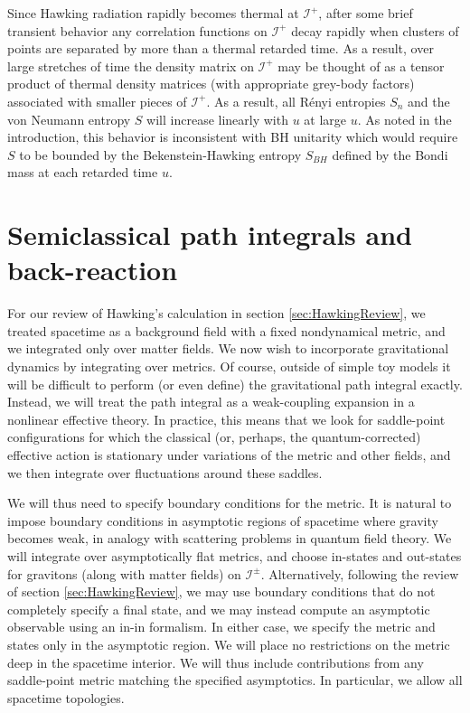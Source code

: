 \documentclass[letterpaper,12pt]{article}
\newcommand*{\scri}{\mathscr{I}} %
\begin{document}
Since Hawking radiation rapidly becomes thermal at $\scri^+$, after some brief transient behavior any correlation functions on $\scri^+$ decay rapidly when clusters of points are separated by more than a thermal retarded time.  As a result, over large stretches of time the density matrix on $\scri^+$ may be thought of as a tensor product of thermal density matrices (with appropriate grey-body factors) associated with smaller pieces of $\scri^+$.   As a result, all R\'enyi entropies $S_n$ and the von Neumann entropy $S$ will increase linearly with $u$ at large $u$.  As noted in the introduction, this behavior is inconsistent with BH unitarity which would require $S$ to be bounded by the Bekenstein-Hawking entropy $S_{BH}$ defined by the Bondi mass at each retarded time $u$.

\section{Semiclassical path integrals and back-reaction}
\label{sec:semiclassical}


For our review of Hawking's calculation in section \ref{sec:HawkingReview}, we treated spacetime as a background field with a fixed nondynamical metric, and  we integrated only over matter fields. We now wish to incorporate gravitational dynamics by integrating over metrics. Of course, outside of simple toy models it will be difficult to perform (or even define) the gravitational path integral exactly. Instead, we will treat the path integral as a weak-coupling expansion in a nonlinear effective theory. In practice, this means that we look for saddle-point configurations for which the classical (or, perhaps, the quantum-corrected) effective action is stationary under variations of the metric and other fields, and we then integrate over fluctuations around these saddles.

We will thus need to specify boundary conditions for the metric. It is natural to impose boundary conditions in asymptotic regions of spacetime where gravity becomes weak, in analogy with scattering problems in quantum field theory.  We will integrate over asymptotically flat metrics, and choose in-states and out-states for gravitons (along with matter fields) on $\scri^\pm$. Alternatively, following the review of section \ref{sec:HawkingReview}, we may use boundary conditions that do not completely specify a final state, and we may instead compute an asymptotic observable using an in-in formalism. In either case, we specify the metric and states only in the asymptotic region.  We will place no restrictions on the metric deep in the spacetime interior.  We will thus include contributions from any saddle-point metric matching the specified asymptotics.  In particular, we allow all spacetime topologies.
\end{document}

